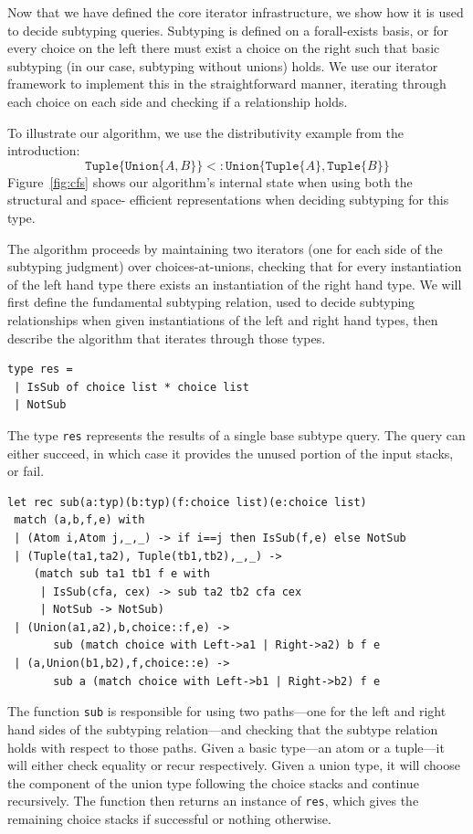 \documentclass[a4paper,english]{lipics-v2019}
\newcommand{\xt}[1]{\texttt{#1}}
\newcommand{\union}[2]{\xt{Union\{}#1,#2\xt{\}}}
\newcommand{\tuple}[1]{\xt{Tuple\{}#1\xt{\}}}
\begin{document}
Now that we have defined the core iterator infrastructure, we show how it
is used to decide subtyping queries. Subtyping is defined on a forall-exists
basis, or for every choice on the left there must exist a choice on the right
such that basic subtyping (in our case, subtyping without unions) holds. We
use our iterator framework to implement this in the straightforward manner, 
iterating through each choice on each side and checking if a relationship holds.

To illustrate our algorithm, we use the  distributivity example from the
introduction: $$\tuple{\union{A}{B}} <: \union{\tuple{A}}{\tuple{B}}$$
Figure~\ref{fig:cfs} shows our algorithm's internal state when using  both the
structural and space- efficient representations when deciding subtyping for
this type.

The algorithm proceeds by maintaining two iterators (one for each side of
the subtyping judgment) over choices-at-unions, checking that for every
instantiation of the left hand type there exists an instantiation of the
right hand type. We will first define the fundamental subtyping relation,
used to decide subtyping relationships when given instantiations of the left
and right hand types, then describe the algorithm that iterates through
those types.

\begin{lstlisting}
type res =
 | IsSub of choice list * choice list
 | NotSub
\end{lstlisting}

The type \verb|res| represents the results of a single base subtype
query. The query can either succeed, in which case it provides the unused
portion of the input stacks, or fail.

\begin{lstlisting}
let rec sub(a:typ)(b:typ)(f:choice list)(e:choice list)
 match (a,b,f,e) with
 | (Atom i,Atom j,_,_) -> if i==j then IsSub(f,e) else NotSub
 | (Tuple(ta1,ta2), Tuple(tb1,tb2),_,_) ->
    (match sub ta1 tb1 f e with
     | IsSub(cfa, cex) -> sub ta2 tb2 cfa cex
     | NotSub -> NotSub)
 | (Union(a1,a2),b,choice::f,e) -> 
       sub (match choice with Left->a1 | Right->a2) b f e
 | (a,Union(b1,b2),f,choice::e) -> 
       sub a (match choice with Left->b1 | Right->b2) f e
\end{lstlisting}


The function \verb|sub| is responsible for using two
paths---one for the left and right hand sides of the subtyping
relation---and checking that the subtype relation holds with respect
to those paths. Given a basic type---an atom or a tuple---it will
either check equality or recur respectively. Given a union type, it
will choose the component of the union type following the choice
stacks and continue recursively. The function then returns an instance
of \verb|res|, which gives the remaining choice stacks if
successful or nothing otherwise.
\end{document}
